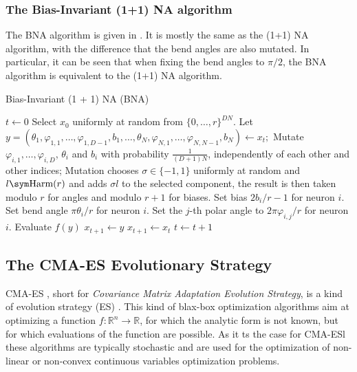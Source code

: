 \subsubsection{The Bias-Invariant (1+1) NA algorithm}

The BNA algorithm is given in .
It is mostly the same as the (1+1) NA algorithm, with the difference that the bend angles are also mutated.
In particular, it can be seen that when fixing the bend angles to $\pi / 2$, the BNA algorithm is equivalent to the (1+1) NA algorithm.

\begin{algorithm}
    \caption{Bias-Invariant (1 + 1) NA (BNA)}
\label{alg:bna}
\begin{algorithmic}
    \State $t \gets 0$
    \State Select $x_0$ uniformly at random from $\{0, \ldots, r\}^{DN}$.
        \State Let $y = (\theta_1, \varphi_{1,1}, \ldots, \varphi_{1,D-1}, b_1, \ldots, \theta_N, \varphi_{N,1}, \ldots, \varphi_{N,N-1}, b_N) \gets x_t;$
            \State Mutate $\varphi_{i,1}, \dots, \varphi_{i,D}$, $\theta_i$ and $b_i$ with probability $\frac{1}{(D+1) N}$, independently of each other and other indices;
            \State Mutation chooses $\sigma \in \{-1, 1\}$ uniformly at random and $l \sym \text{Harm}(r)$ and adds $\sigma l$ to the selected component, the
            result is then taken modulo $r$ for angles and modulo $r + 1$ for biases.
                \State Set bias $2b_i / r - 1$ for neuron $i$.
                \State Set bend angle $\pi \theta_i / r$ for neuron $i$.
                    \State Set the $j$-th polar angle to $2\pi \varphi_{i,j} / r$ for neuron $i$.
                \EndFor
            \EndFor
            \State Evaluate $f(y)$
                \State $x_{t+1} \gets y$
            \Else
                \State $x_{t+1} \gets x_t$
            \EndIf
        \EndFor
        \State $t \gets t + 1$
    \EndWhile
\end{algorithmic}
\end{algorithm}

\subsection{The CMA-ES Evolutionary Strategy}

CMA-ES \cite{cmaes}, short for \textit{Covariance Matrix Adaptation Evolution Strategy}, is a kind of evolution strategy (ES) \cite{es_intro}.
This kind of blax-box optimization algorithms aim at optimizing a function $f : \mathds{R}^n \to \mathds{R}$, for which the analytic form is not known,
but for which evaluations of the function are possible. As it ts the case for CMA-ESl these algorithms are typically stochastic and are used for the optimization of
non-linear or non-convex continuous variables optimization problems.

